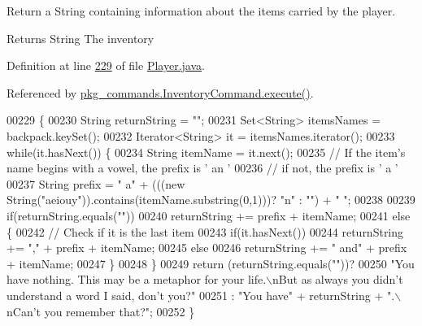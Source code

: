 Return a String containing information about the items carried by the player. 

\begin{DoxyReturn}{Returns}
String The inventory 
\end{DoxyReturn}


Definition at line \hyperlink{Player_8java_source_l00229}{229} of file \hyperlink{Player_8java_source}{Player.\-java}.



Referenced by \hyperlink{InventoryCommand_8java_source_l00023}{pkg\-\_\-commands.\-Inventory\-Command.\-execute()}.


\begin{DoxyCode}
00229                                  \{
00230         String returnString = \textcolor{stringliteral}{""};
00231         Set<String> itemsNames = backpack.keySet();
00232         Iterator<String> it = itemsNames.iterator();
00233         \textcolor{keywordflow}{while}(it.hasNext()) \{
00234             String itemName = it.next();
00235             \textcolor{comment}{// If the item's name begins with a vowel, the prefix is ' an '}
00236             \textcolor{comment}{// if not, the prefix is ' a '}
00237             String prefix = \textcolor{stringliteral}{" a"} + (((\textcolor{keyword}{new} String(\textcolor{stringliteral}{"aeiouy"})).contains(itemName.substring(0,1)))? \textcolor{stringliteral}{"n"} : \textcolor{stringliteral}{""}) +
       \textcolor{stringliteral}{" "};
00238 
00239             \textcolor{keywordflow}{if}(returnString.equals(\textcolor{stringliteral}{""}))
00240                 returnString += prefix + itemName;
00241             \textcolor{keywordflow}{else} \{
00242                 \textcolor{comment}{// Check if it is the last item}
00243                 \textcolor{keywordflow}{if}(it.hasNext())
00244                     returnString += \textcolor{stringliteral}{","} + prefix + itemName;
00245                 \textcolor{keywordflow}{else}
00246                     returnString += \textcolor{stringliteral}{" and"} + prefix + itemName;
00247             \}
00248         \}
00249         \textcolor{keywordflow}{return} (returnString.equals(\textcolor{stringliteral}{""}))?
00250             \textcolor{stringliteral}{"You have nothing. This may be a metaphor for your life.\(\backslash\)nBut as always you didn't understand a
       word I said, don't you?"}
00251             : \textcolor{stringliteral}{"You have"} + returnString + \textcolor{stringliteral}{".\(\backslash\)nCan't you remember that?"};
00252     \}
\end{DoxyCode}


